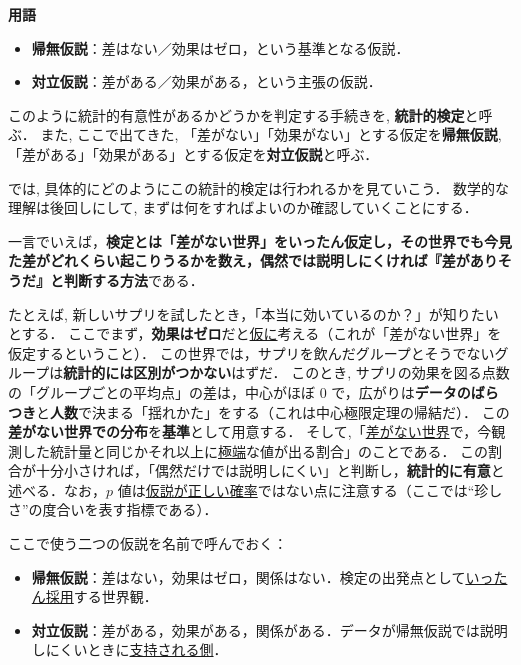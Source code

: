     \noindent\textbf{用語}
    \begin{itemize}
      \item \textbf{帰無仮説}：差はない／効果はゼロ，という基準となる仮説．
      \item \textbf{対立仮説}：差がある／効果がある，という主張の仮説．
    \end{itemize}
    
    このように統計的有意性があるかどうかを判定する手続きを,
    \textbf{統計的検定}と呼ぶ．
    また, ここで出てきた,
    「差がない」「効果がない」とする仮定を\textbf{帰無仮説},
    「差がある」「効果がある」とする仮定を\textbf{対立仮説}と呼ぶ．

    では, 具体的にどのようにこの統計的検定は行われるかを見ていこう．
    数学的な理解は後回しにして, まずは何をすればよいのか確認していくことにする．

 一言でいえば，\textbf{検定とは「差がない世界」をいったん仮定し，その世界でも今見た差がどれくらい起こりうるかを数え，偶然では説明しにくければ『差がありそうだ』と判断する方法}である．

  たとえば, 新しいサプリを試したとき，「本当に効いているのか？」が知りたいとする．
  ここでまず，\textbf{効果はゼロ}だと\underline{仮に}考える（これが「差がない世界」を仮定するということ）．
  この世界では，サプリを飲んだグループとそうでないグループは\textbf{統計的には区別がつかない}はずだ．
  このとき, サプリの効果を図る点数の「グループごとの平均点」の差は，中心がほぼ $0$ で，広がりは\textbf{データのばらつき}と\textbf{人数}で決まる「揺れかた」をする（これは中心極限定理の帰結だ）．
  この\textbf{差がない世界での分布}を\textbf{基準}として用意する．
  そして,「\underline{差がない世界}で，今観測した統計量と同じかそれ以上に\underline{極端}な値が出る割合」のことである．
  この割合が十分小さければ，「偶然だけでは説明しにくい」と判断し，\textbf{統計的に有意}と述べる．なお，$p$ 値は\underline{仮説が正しい確率}ではない点に注意する（ここでは“珍しさ”の度合いを表す指標である）．

  ここで使う二つの仮説を名前で呼んでおく：
  \begin{itemize}
    \item \textbf{帰無仮説}：差はない，効果はゼロ，関係はない．検定の出発点として\underline{いったん採用}する世界観．
    \item \textbf{対立仮説}：差がある，効果がある，関係がある．データが帰無仮説では説明しにくいときに\underline{支持される側}．
  \end{itemize}

